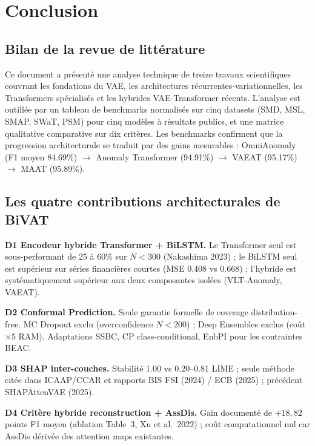\documentclass[12pt,a4paper]{article}
\begin{document}
\section{Conclusion}

\subsection{Bilan de la revue de littérature}

Ce document a présenté une analyse technique de treize travaux scientifiques
couvrant les fondations du VAE, les architectures récurrentes-variationnelles,
les Transformers spécialisés et les hybrides VAE-Transformer récents. L'analyse
est outillée par un tableau de benchmarks normalisés sur cinq datasets (SMD,
MSL, SMAP, SWaT, PSM) pour cinq modèles à résultats publics, et une matrice
qualitative comparative sur dix critères. Les benchmarks confirment que la
progression architecturale se traduit par des gains mesurables : OmniAnomaly
(F1 moyen 84.69\%) $\rightarrow$ Anomaly Transformer (94.91\%) $\rightarrow$
VAEAT (95.17\%) $\rightarrow$ MAAT (95.89\%).

\subsection{Les quatre contributions architecturales de BiVAT}

\textbf{D1  Encodeur hybride Transformer + BiLSTM.} Le Transformer seul est
sous-performant de 25 à 60\% sur $N < 300$ (Nakashima 2023) ; le BiLSTM seul
est supérieur sur séries financières courtes (MSE 0.408 vs 0.668) ; l'hybride
est systématiquement supérieur aux deux composantes isolées (VLT-Anomaly,
VAEAT).

\textbf{D2  Conformal Prediction.} Seule garantie formelle de coverage
distribution-free. MC Dropout exclu (overconfidence $N<200$) ; Deep Ensembles
exclus (coût $\times 5$ RAM). Adaptations SSBC, CP class-conditional, EnbPI
pour les contraintes BEAC.

\textbf{D3  SHAP inter-couches.} Stabilité 1.00 vs 0.20--0.81 LIME ; seule
méthode citée dans ICAAP/CCAR et rapports BIS FSI (2024) / ECB (2025) ;
précédent SHAPAttenVAE (2025).

\textbf{D4  Critère hybride reconstruction + AssDis.} Gain documenté de
$+18{,}82$ points F1 moyen (ablation Table~3, Xu et al.\ 2022) ; coût
computationnel nul car AssDis dérivée des attention maps existantes.
\end{document}

